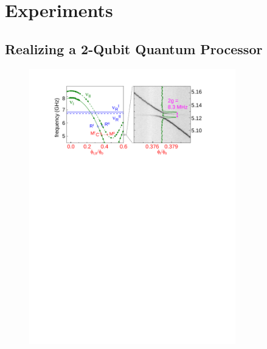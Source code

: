 
\chapter{Experiments}


\section{Realizing a 2-Qubit Quantum Processor}


\begin{figure}
	\centering	
	\includegraphics[width=0.8\textwidth]{./material/papers/iswap/figures/2_qubit_processor_spectrocopy}
	\label{fig:ProcessorSpectroscopy}
	\caption{}
\end{figure}

